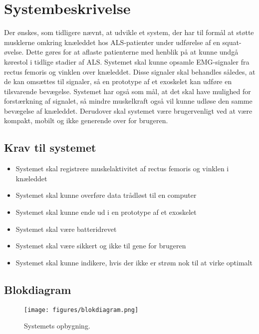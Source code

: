 \section{Systembeskrivelse}
Der ønskes, som tidligere nævnt, at udvikle et system, der har til formål at støtte musklerne omkring knæleddet hos ALS-patienter under udførelse af en squat-øvelse. Dette gøres for at aflaste patienterne med henblik på at kunne undgå kørestol i tidlige stadier af ALS. Systemet skal kunne opsamle EMG-signaler fra rectus femoris og vinklen over knæleddet. Disse signaler skal behandles således, at de kan omsættes til signaler, så en prototype af et exoskelet kan udføre en tilsvarende bevægelse. Systemet har også som mål, at det skal have mulighed for forstærkning af signalet, så mindre muskelkraft også vil kunne udløse den samme bevægelse af knæleddet. Derudover skal systemet være brugervenligt ved at være kompakt, mobilt og ikke generende over for brugeren.

\subsection{Krav til systemet} 
\begin{itemize}
\item Systemet skal registrere muskelaktivitet af rectus femoris og vinklen i knæleddet
\item Systemet skal kunne overføre data trådløst til en computer
\item Systemet skal kunne ende ud i en prototype af et exoskelet
\item Systemet skal være batteridrevet
\item Systemet skal være sikkert og ikke til gene for brugeren 
\item Systemet skal kunne indikere, hvis der ikke er strøm nok til at virke optimalt
\end{itemize}


\subsection{Blokdiagram}
\begin{figure}[H]
\centering
\texttt{[image: figures/blokdiagram.png]}
\caption{Systemets opbygning.}
\label{fig:blokdiagram}
\end{figure}

